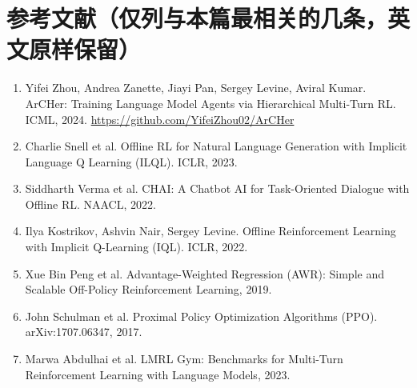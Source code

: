 \documentclass[11pt,UTF8,fontset=fandol]{ctexart}
\begin{document}
\section*{参考文献（仅列与本篇最相关的几条，英文原样保留）}
\begin{enumerate}[leftmargin=2em]
\item Yifei Zhou, Andrea Zanette, Jiayi Pan, Sergey Levine, Aviral Kumar. ArCHer: Training Language Model Agents via Hierarchical Multi-Turn RL. ICML, 2024. \url{https://github.com/YifeiZhou02/ArCHer}
\item Charlie Snell et al. Offline RL for Natural Language Generation with Implicit Language Q Learning (ILQL). ICLR, 2023.
\item Siddharth Verma et al. CHAI: A Chatbot AI for Task-Oriented Dialogue with Offline RL. NAACL, 2022.
\item Ilya Kostrikov, Ashvin Nair, Sergey Levine. Offline Reinforcement Learning with Implicit Q-Learning (IQL). ICLR, 2022.
\item Xue Bin Peng et al. Advantage-Weighted Regression (AWR): Simple and Scalable Off-Policy Reinforcement Learning, 2019.
\item John Schulman et al. Proximal Policy Optimization Algorithms (PPO). arXiv:1707.06347, 2017.
\item Marwa Abdulhai et al. LMRL Gym: Benchmarks for Multi-Turn Reinforcement Learning with Language Models, 2023.
\end{enumerate}
\end{document}
